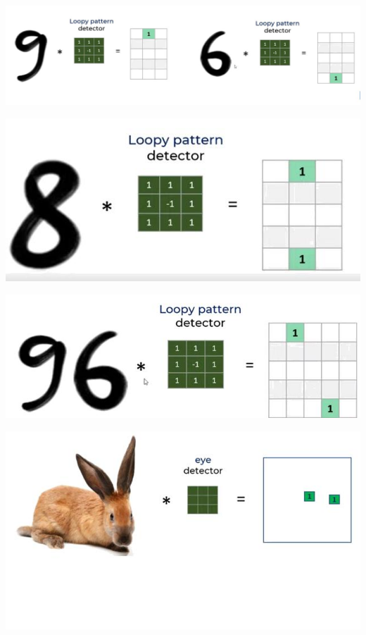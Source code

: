 \documentclass[12pt,aspectratio=169]{beamer}
\begin{document}
\begin{frame}
\begin{center}
\includegraphics[scale=0.4]{nine4}
\end{center}
\end{frame}


\begin{frame}
\begin{center}
\includegraphics[scale=0.4]{eight}
\end{center}
\end{frame}


\begin{frame}
\begin{center}
\includegraphics[scale=0.4]{ninesix}
\end{center}
\end{frame}

\begin{frame}
\begin{center}
\includegraphics[scale=0.6]{eyedetect}
\end{center}
\end{frame}
\end{document}
